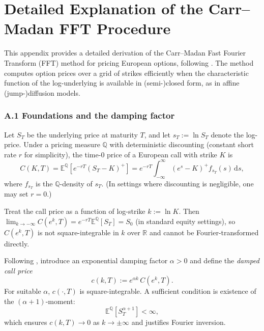 \documentclass[a4paper,titlepage,12pt]{report}
\theoremstyle{plain}
\begin{document}
\appendix
\newpage
\chapter{Detailed Explanation of the Carr--Madan FFT Procedure}
\label{app:carr_madan}
\setcounter{equation}{0} %
\renewcommand{\theequation}{A.\arabic{equation}} %

\noindent
This appendix provides a detailed derivation of the Carr--Madan Fast Fourier Transform (FFT)
method for pricing European options, following \citet{CarrMadan1999}. The method computes option
prices over a grid of strikes efficiently when the characteristic function of the log-underlying
is available in (semi-)closed form, as in affine (jump-)diffusion models.

\subsection*{A.1 Foundations and the damping factor}

\noindent
Let $S_T$ be the underlying price at maturity $T$, and let $s_T:=\ln S_T$ denote the log-price.
Under a pricing measure $\mathbb{Q}$ with deterministic discounting (constant short rate $r$ for
simplicity), the time-$0$ price of a European call with strike $K$ is
\[
C(K,T)
=
\mathbb{E}^{\mathbb{Q}}\!\left[e^{-rT}(S_T-K)^+\right]
=
e^{-rT}\int_{-\infty}^{\infty} (e^{s}-K)^+ f_{s_T}(s)\,\mathrm{d}s,
\]
where $f_{s_T}$ is the $\mathbb{Q}$-density of $s_T$. (In settings where discounting is negligible,
one may set $r=0$.)

Treat the call price as a function of log-strike $k:=\ln K$. Then
$\lim_{k\to -\infty} C(e^k,T)=e^{-rT}\mathbb{E}^{\mathbb{Q}}[S_T]=S_0$ (in standard equity settings),
so $C(e^k,T)$ is not square-integrable in $k$ over $\mathbb{R}$ and cannot be Fourier-transformed
directly.

Following \citet{CarrMadan1999}, introduce an exponential damping factor $\alpha>0$ and define the
\emph{damped call price}
\begin{equation}
c(k,T) := e^{\alpha k}\,C(e^k,T).
\label{eq:damped_price}
\end{equation}
For suitable $\alpha$, $c(\cdot,T)$ is square-integrable. A sufficient condition is existence of
the $(\alpha+1)$-moment:
\[
\mathbb{E}^{\mathbb{Q}}[S_T^{\alpha+1}] < \infty,
\]
which ensures $c(k,T)\to 0$ as $k\to\pm\infty$ and justifies Fourier inversion.
\end{document}

